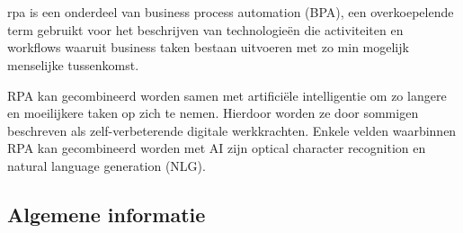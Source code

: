 \chapter{}
\label{ch:stand-van-zaken}





\acrshort{rpa} is een onderdeel van business process automation (BPA), een overkoepelende term gebruikt voor het beschrijven van technologieën die activiteiten en workflows waaruit business taken bestaan uitvoeren met zo min mogelijk menselijke tussenkomst. \autocite{everythingRPA}

RPA kan gecombineerd worden samen met artificiële intelligentie om zo langere en moeilijkere taken op zich te nemen. Hierdoor worden ze door sommigen beschreven als zelf-verbeterende digitale werkkrachten. Enkele velden waarbinnen RPA kan gecombineerd worden met AI zijn optical character recognition en natural language generation (NLG). \autocite{everythingRPA}

\section{Algemene informatie}

